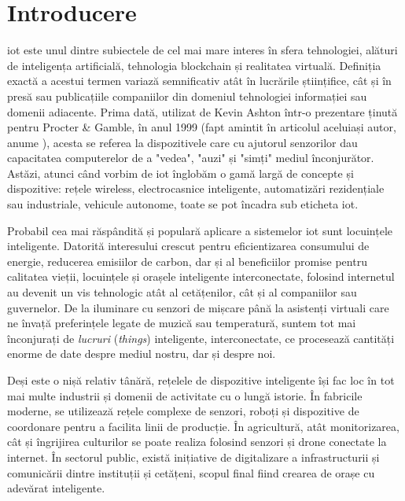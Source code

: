 \chapter{Introducere}

\acrlong{iot} este unul dintre subiectele de cel mai mare interes în sfera tehnologiei,
alături de inteligența artificială, tehnologia blockchain și realitatea virtuală. 
Definiția exactă a acestui termen variază semnificativ atât în lucrările
științifice, cât și în presă sau publicațiile companiilor din domeniul tehnologiei informației sau domenii adiacente. Prima dată, utilizat de Kevin Ashton într-o prezentare ținută pentru Procter \& Gamble, în anul 1999 (fapt amintit în articolul aceluiași autor, anume ), acesta se referea la dispozitivele care cu ajutorul senzorilor dau capacitatea computerelor de a "vedea", "auzi" și "simți" mediul înconjurător. Astăzi, atunci când vorbim de \acrshort{iot} înglobăm o gamă largă de concepte și dispozitive: rețele wireless, electrocasnice inteligente, automatizări rezidențiale sau industriale, vehicule autonome, toate se pot încadra sub eticheta \acrshort{iot}.

Probabil cea mai răspândită și populară aplicare a sistemelor \acrshort{iot} sunt locuințele inteligente. Datorită interesului crescut pentru eficientizarea consumului de energie, reducerea emisiilor de carbon, dar și al beneficiilor promise pentru calitatea vieții, locuințele și orașele inteligente interconectate, folosind internetul au devenit un vis tehnologic atât al cetățenilor, cât și al companiilor sau guvernelor. De la iluminare cu senzori de mișcare până la asistenți virtuali care ne învață preferințele legate de muzică sau temperatură, suntem tot mai înconjurați de \textit{lucruri} (\textit{things}) inteligente, interconectate, ce procesează cantități enorme de date despre mediul nostru, dar și despre noi. 

Deși este o nișă relativ tânără, rețelele de dispozitive inteligente își fac loc în tot mai multe industrii și domenii de activitate cu o lungă istorie. În fabricile moderne, se utilizează rețele complexe de senzori, roboți și dispozitive de coordonare pentru a facilita linii de producție. În agricultură, atât monitorizarea, cât și îngrijirea culturilor se poate realiza folosind senzori și drone conectate la internet. În sectorul public, există inițiative de digitalizare a infrastructurii și comunicării dintre instituții și cetățeni, scopul final fiind crearea de orașe cu adevărat inteligente. 

